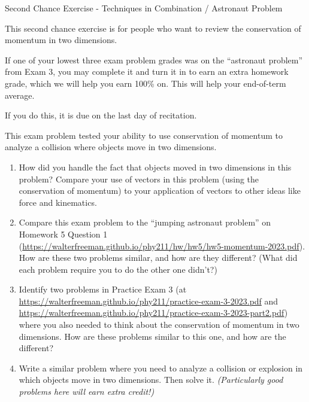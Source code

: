 \documentclass[12pt]{article}
\begin{document}
\begin{center}
\Large
\sc Second Chance Exercise - Techniques in Combination / Astronaut Problem \rm





\normalsize
This second chance exercise is for people who want to review the conservation of momentum in two dimensions.

If one of your lowest three exam problem grades was on the ``astronaut problem'' from Exam 3, you may complete it and turn it in to earn an extra homework grade, which we will help you earn 100\% on. This will help your end-of-term average.

If you do this, it is due on the last day of recitation.

\end{center}

\vspace{1.5in}

This exam problem tested your ability to use conservation of momentum to analyze a collision where objects move in two dimensions.

\begin{enumerate}
	
		\item How did you handle the fact that objects moved in two dimensions in this problem? Compare your use of vectors in this problem (using the conservation of momentum) to your application of vectors to other ideas like force and kinematics.
		
		\item Compare this exam problem to the ``jumping astronaut problem'' on Homework 5 Question 1 (\url{https://walterfreeman.github.io/phy211/hw/hw5/hw5-momentum-2023.pdf}). How are these two problems similar, and how are they different? (What did each problem require you to do the other one didn't?)

\item Identify two problems in Practice Exam 3 (at \url{https://walterfreeman.github.io/phy211/practice-exam-3-2023.pdf} and \url{https://walterfreeman.github.io/phy211/practice-exam-3-2023-part2.pdf}) where you also needed to think about the conservation of momentum in two dimensions. How are these problems similar to this one, and how are the different?
	
    \item Write a similar problem where you need to analyze a collision or explosion in which objects move in two dimensions. Then solve it. {\it (Particularly good problems here will earn extra credit!)}
\end{enumerate}
\end{document}
